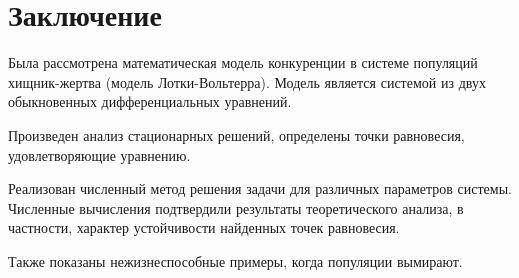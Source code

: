 \chapter{Заключение}
Была рассмотрена математическая модель конкуренции в системе популяций хищник-жертва (модель Лотки-Вольтерра).
Модель является системой из двух обыкновенных дифференциальных уравнений.

Произведен анализ стационарных решений, определены точки равновесия, удовлетворяющие уравнению.

Реализован численный метод решения задачи для различных параметров системы. Численные вычисления подтвердили результаты теоретического анализа, в частности, характер устойчивости найденных точек равновесия.

Также показаны нежизнеспособные примеры, когда популяции вымирают.